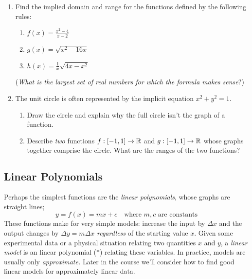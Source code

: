 \begin{exercises}{}{}
\begin{enumerate}
	  
	  \item Find the implied domain and range for the functions defined by the following rules:
	  \begin{enumerate}
	    \item $f(x)=\frac{x^2-4}{x-2}$
	    \item $g(x)=\sqrt{x^2-16x}$
	    \item $h(x)=\frac 1x\sqrt{4x-x^2}$
	  \end{enumerate}
	  (\emph{What is the largest set of real numbers for which the formula makes sense}?)
	  
	  
	  \item The unit circle is often represented by the implicit equation $x^2+y^2=1$.
	  \begin{enumerate}
	    \item Draw the circle and explain why the full circle isn't the graph of a function.
	    \item Describe \emph{two} functions $f:[-1,1]\to\mathbb{R}$ and $g:[-1,1]\to\mathbb{R}$ whose graphs together comprise the circle. What are the ranges of the two functions?
	  \end{enumerate}
	  
	\end{enumerate}
\end{exercises}


\clearpage



\subsection{Linear Polynomials}

Perhaps the simplest functions are the \emph{linear polynomials}, whose graphs are straight lines;
\[
	y=f(x)=mx+c\quad\text{where $m,c$ are constants} \tag{$\ast$}
\]
These functions make for very simple models: increase the input by $\Delta x$ and the output changes by $\Delta y=m\Delta x$ \emph{regardless} of the starting value $x$. Given some experimental data or a physical situation relating two quantities $x$ and $y$, a \emph{linear model} is an linear polynomial ($\ast$) relating these variables. In practice, models are usually only \emph{approximate.} Later in the course we'll consider how to find good linear models for approximately linear data.


